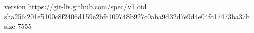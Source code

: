 version https://git-lfs.github.com/spec/v1
oid sha256:201e5100c8f2406d159e2bfc109748b927c0aba9d32d7e9d4e04fc17473ba37b
size 7555
